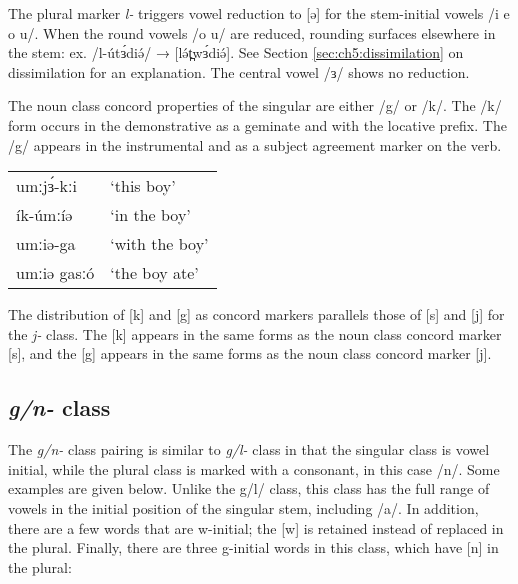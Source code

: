 The plural marker \textit{l-} triggers vowel reduction to [ə] for the stem-initial vowels /i e o u/. When the round vowels /o u/ are reduced, rounding surfaces elsewhere in the stem: ex. /l-útɜ́diə́/ → [lə́t̪wɜ́diə́]. See Section \ref{sec:ch5:dissimilation} on dissimilation for an explanation. The central vowel /ɜ/ shows no reduction.

The noun class concord properties of the singular are either /g/ or /k/. The /k/ form occurs in the demonstrative as a geminate and with the locative prefix. The /g/ appears in the instrumental and as a subject agreement marker on the verb.  

\ea	
\begin{tabular}[t]{ll}
umːjɜ́-kːi	&	‘this boy’\\
ík-úmːíə	&	‘in the boy’\\
umːiə-ga	&	‘with the boy’\\
umːiə gasːó	&	‘the boy ate’\\
\end{tabular}
\z
The distribution of [k] and [g] as concord markers parallels those of [s] and [j] for the \textit{j-} class. The [k] appears in the same forms as the noun class concord marker [s], and the [g] appears in the same forms as the noun class concord marker [j].


\subsection{\textit{g/n-} class}
The \textit{g/n-} class pairing is similar to \textit{g/l-} class in that the singular class is vowel initial, while the plural class is marked with a consonant, in this case /n/. Some examples are given below. Unlike the g/l/ class, this class has the full range of vowels in the initial position of the singular stem, including /a/.  In addition, there are a few words that are w-initial; the [w] is retained instead of replaced in the plural. Finally, there are three g-initial words in this class, which have [n] in the plural:

